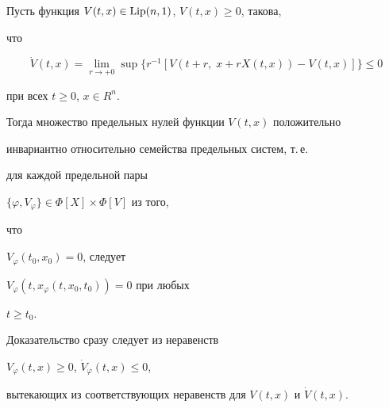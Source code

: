  




\begin{lemnonum} Пусть функция $V(t,x)\in\operatorname{Lip}(n,1)$, $V(t,x)\ge0$, такова, 


что 


$$ 


\Dot V(t,x)=\lim_{r\to +0}\sup\{r^{-1}[V(t+r,\;x+rX(t,x))- 


V(t,x)]\}\le 0 


$$ 


при всех $t\ge 0$, $x\in R^n$. 


 


Тогда множество предельных нулей функции $V(t,x)$ положительно 


инвариантно относительно семейства предельных систем, т.\,е. 


для каждой предельной пары 


$\{\varphi,V_\varphi\}\in\Phi[X]\times\Phi[V]$ из того, 


что 


$V_\varphi(t_0,x_0)=0$, следует


$V_\varphi(t,x_\varphi(t,x_0,t_0))=0$ при любых 


$t\ge t_0$. 


\end{lemnonum} 


 


Доказательство сразу следует из неравенств 


$V_\varphi(t,x)\ge 0$, $\Dot V_\varphi(t,x)\le 0$, 


вытекающих из соответствующих неравенств для $V(t,x)$ и $\Dot V(t,x)$. 


 




